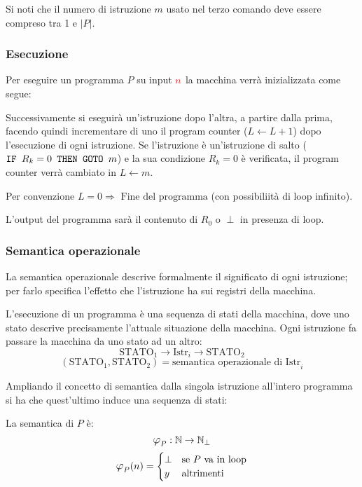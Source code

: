 Si noti che il numero di istruzione $m$ usato nel terzo comando deve essere compreso tra
1 e $|P|$.

\subsubsection*{Esecuzione}
Per eseguire un programma $P$ su input $\color{red}n$ la macchina verrà inizializzata come segue:
\begin{figure}[H]
    \centering
    
\end{figure}

Successivamente si eseguirà un'istruzione dopo l'altra, a partire dalla prima, facendo quindi
incrementare di uno il program counter ($L\leftarrow L+1$) dopo l'esecuzione di ogni istruzione.
Se l'istruzione è un'istruzione di salto ($\texttt{IF $R_k=0$ THEN GOTO $m$}$) e la sua condizione $R_k=0$
è verificata, il program counter verrà cambiato in $L\leftarrow m$.

Per convenzione $L=0 \Rightarrow \text{ Fine del programma}$ (con possibiliità di loop infinito).

L'output del programma sarà il contenuto di $R_0$ o $\perp$ in presenza di loop.

\subsubsection*{Semantica operazionale}
La semantica operazionale descrive formalmente il significato di ogni istruzione; per farlo
specifica l'effetto che l'istruzione ha sui registri della macchina.

L'esecuzione di un programma è una sequenza di stati della macchina, dove uno stato descrive
precisamente l'attuale situazione della macchina. Ogni istruzione fa passare la macchina da
uno stato ad un altro:
$$ \text{STATO}_1 \rightarrow \boxed{\text{Istr}_i} \rightarrow \text{STATO}_2 $$
$$ (\text{STATO}_1,\text{STATO}_2) = \text{semantica operazionale di Istr}_i $$

Ampliando il concetto di semantica dalla singola istruzione all'intero programma si ha che 
quest'ultimo induce una sequenza di stati:
\begin{figure}[H]
    \centering
    
\end{figure}

La semantica di $P$ è:
$$ \semantica_P:\N\to\N_\perp $$
$$ \semantica_P(n) = \begin{cases}
\perp & \text{se $P$ va in loop}\\
y & \text{altrimenti}
\end{cases} $$

